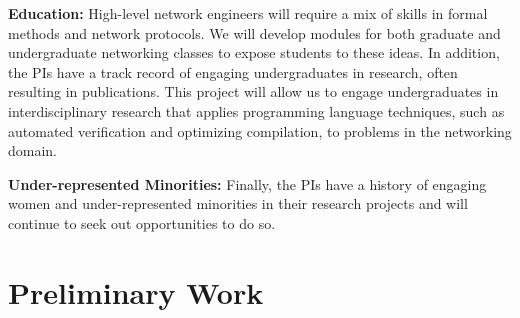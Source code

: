 \noindent
{\bf Education:} 
High-level network engineers will require a mix of skills in 
formal methods and network protocols.  We will develop modules for
both graduate and undergraduate networking classes to expose students
to these ideas.
In addition,
the PIs have a track record of engaging undergraduates in research, often resulting in publications.  This project will allow us to engage undergraduates in interdisciplinary
research that applies programming language techniques, such as
automated verification and optimizing compilation, to problems in the networking domain. 

\noindent
{\bf Under-represented Minorities:} Finally, the PIs have a history of engaging women and under-represented minorities in
their research projects and will continue to seek out opportunities to
do so.  

\section{Preliminary Work}
\label{sec:propane}

